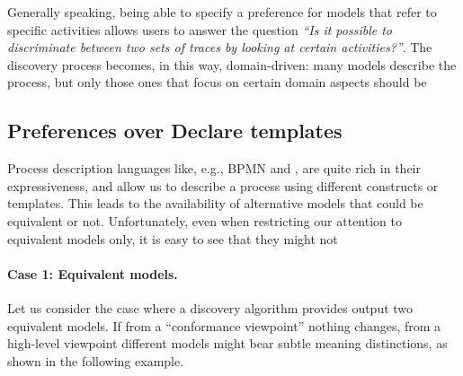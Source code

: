 Generally speaking, being able to specify a preference for models that refer to specific activities allows users to answer the question \emph{``Is it possible to discriminate between two sets of traces by looking at certain activities?''}. The discovery process becomes, in this way, domain-driven: many models describe the process, but only those ones that focus on certain domain aspects should be  %




\subsection{Preferences over Declare templates}
\label{subsec:prefOverTemplates}

Process description languages like, e.g., BPMN and \declare, are quite rich in their expressiveness, and allow us to describe a process using different constructs or templates. This leads to the availability of alternative models that could be equivalent or not. Unfortunately, even when restricting our attention to equivalent models only, it is easy to see that they might not 


\paragraph{Case 1: Equivalent models.} Let us consider  the %
 case where a discovery algorithm provides  %
 output two equivalent models. If from a ``conformance viewpoint'' nothing changes, from a high-level viewpoint different models might bear subtle meaning distinctions, as shown in the following example.

